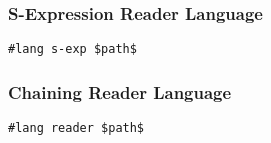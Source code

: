 \subsubsection{S-Expression Reader Language}

\begin{lstlisting}
#lang s-exp $path$
\end{lstlisting}





\subsubsection{Chaining Reader Language}

\begin{lstlisting}
#lang reader $path$
\end{lstlisting}






